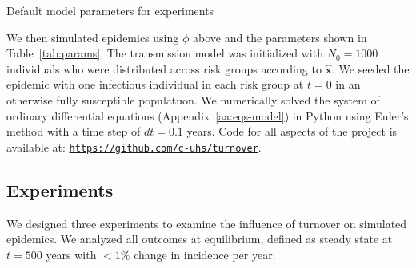 \begin{table}
  \centering
  \caption{Default model parameters for experiments}
  \label{tab:params}
  
\end{table}
We then simulated epidemics using $\phi$ above
and the parameters shown in Table~\ref{tab:params}.
The transmission model was initialized with $N_0 = 1000$ individuals
who were distributed across risk groups according to $\bm{\hat{x}}$.
We seeded the epidemic with
one infectious individual in each risk group at $t = 0$ in an otherwise 
fully susceptible populatuon.
We numerically solved the system of ordinary differential equations
(Appendix~\ref{aa:eqs-model}) in Python
using Euler's method with a time step of $dt = 0.1$ years.
Code for all aspects of the project is available at:
\href{https://github.com/c-uhs/turnover}{\small\texttt{https://github.com/c-uhs/turnover}}.
\subsection{Experiments}
\label{ss:exp}
We designed three experiments to examine the influence of turnover on simulated epidemics.
We analyzed all outcomes at equilibrium,
defined as steady state at $t = 500$ years
with $<1\%$ change in incidence per year.
